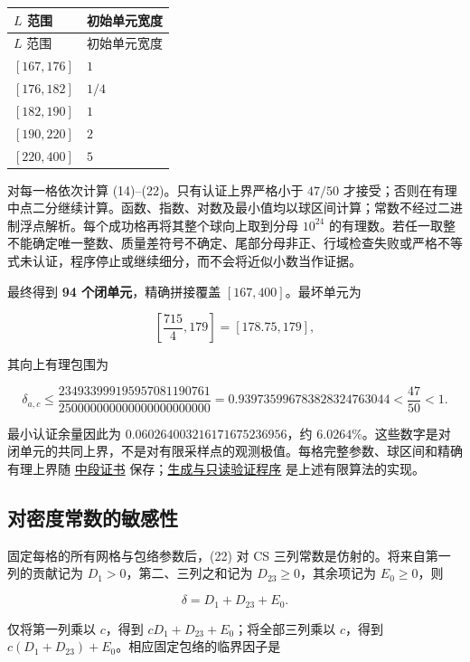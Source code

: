 \documentclass[UTF8,zihao=-4,fontset=fandol]{ctexart}
\begin{document}
\begingroup\small\setlength{\tabcolsep}{3pt}
\begin{longtable}{>{\raggedright\arraybackslash}p{}>{\raggedright\arraybackslash}p{}}
\toprule
\(L\) 范围 & 初始单元宽度 \\
\midrule\endfirsthead
\toprule
\(L\) 范围 & 初始单元宽度 \\
\midrule\endhead
\bottomrule\endfoot
\([167,176]\) & \(1\) \\
\([176,182]\) & \(1/4\) \\
\([182,190]\) & \(1\) \\
\([190,220]\) & \(2\) \\
\([220,400]\) & \(5\) \\
\end{longtable}
\endgroup

对每一格依次计算 (14)–(22)。只有认证上界严格小于 \(47/50\) 才接受；否则在有理中点二分继续计算。函数、指数、对数及最小值均以球区间计算；常数不经过二进制浮点解析。每个成功格再将其整个球向上取到分母 \(10^{24}\) 的有理数。若任一取整不能确定唯一整数、质量差符号不确定、尾部分母非正、行域检查失败或严格不等式未认证，程序停止或继续细分，而不会将近似小数当作证据。

最终得到 \textbf{94 个闭单元}，精确拼接覆盖 \([167,400]\)。最坏单元为

\[
\left[\frac{715}{4},179\right]=[178.75,179],
\]

其向上有理包围为

\[
\delta_{a,c}\le
\frac{234933999195957081190761}{250000000000000000000000}
=0.939735996783828324763044
<\frac{47}{50}<1. \tag{23}
\]

最小认证余量因此为 \(0.060264003216171675236956\)，约 \(6.0264\%\)。这些数字是对闭单元的共同上界，不是对有限采样点的观测极值。每格完整参数、球区间和精确有理上界随 \href{../results/smooth_k6_certificate.json}{中段证书} 保存；\href{../code/certify_smooth_k6.py}{生成与只读验证程序} 是上述有限算法的实现。

\subsection{对密度常数的敏感性}

固定每格的所有网格与包络参数后，(22) 对 CS 三列常数是仿射的。将来自第一列的贡献记为 \(D_1>0\)，第二、三列之和记为 \(D_{23}\ge0\)，其余项记为 \(E_0\ge0\)，则

\[
\delta=D_1+D_{23}+E_0.
\]

仅将第一列乘以 \(c\)，得到 \(cD_1+D_{23}+E_0\)；将全部三列乘以 \(c\)，得到 \(c(D_1+D_{23})+E_0\)。相应固定包络的临界因子是
\end{document}
